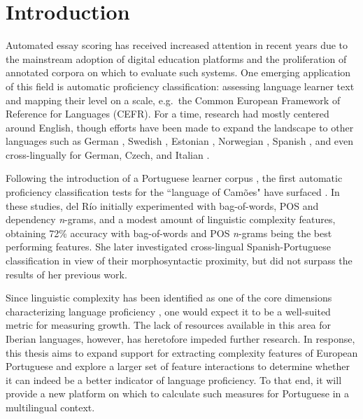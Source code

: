\section{Introduction}

Automated essay scoring has received increased attention in recent years due to the mainstream adoption of digital education platforms and the proliferation of annotated corpora on which to evaluate such systems. One emerging application of this field is automatic proficiency classification: assessing language learner text and mapping their level on a scale, e.g.\ the Common European Framework of Reference for Languages (CEFR). For a time, research had mostly centered around English, though efforts have been made to expand the landscape to other languages such as German \citep{hancke2013-german, weiss2019-german}, Swedish \citep{ostling2013-swedish, pilan2016-swedish}, Estonian \citep{vajjala2014-estonian}, Norwegian \citep{berggren2019-norwegian}, Spanish \citep{delrio2019b}, and even cross-lingually for German, Czech, and Italian \citep{vajjala2018-cefr}.

Following the introduction of a Portuguese learner corpus \citep{delrio2018}, the first automatic proficiency classification tests for the ``language of Camões" have surfaced \citep{delrio2019a, delrio2019b}. In these studies, del Río initially experimented with bag-of-words, POS and dependency \textit{n}-grams, and a modest amount of linguistic complexity features, obtaining 72\% accuracy with bag-of-words and POS \textit{n}-grams being the best performing features. She later investigated cross-lingual Spanish-Portuguese classification in view of their morphosyntactic proximity, but did not surpass the results of her previous work.

Since linguistic complexity has been identified as one of the core dimensions characterizing language proficiency \citep{housen2009}, one would expect it to be a well-suited metric for measuring growth. The lack of resources available in this area for Iberian languages, however, has heretofore impeded further research. In response, this thesis aims to expand support for extracting complexity features of European Portuguese and explore a larger set of feature interactions to determine whether it can indeed be a better indicator of language proficiency. To that end, it will provide a new platform on which to calculate such measures for Portuguese in a multilingual context.

